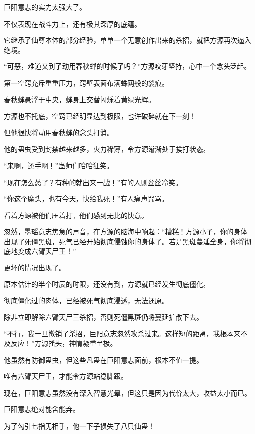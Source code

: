 
\begin{this_body}



巨阳意志的实力太强大了。

不仅表现在战斗力上，还有极其深厚的底蕴。

它继承了仙尊本体的部分经验，单单一个无意创作出来的杀招，就把方源再次逼入绝境。

“可恶，难道又到了动用春秋蝉的时候了吗？”方源咬牙坚持，心中一个念头泛起。

第一空窍充斥重重压力，窍壁表面布满蛛网般的裂痕。

春秋蝉悬浮于中央，蝉身上交替闪烁着黄绿光辉。

方源也不托底，空窍已经明显达到极限，也许破碎就在下一刻！

但他很快将动用春秋蝉的念头打消。

他的蛊虫受到封禁越来越多，火力稀薄，令方源渐渐处于挨打状态。

“来啊，还手啊！”蛊师们哈哈狂笑。

“现在怎么怂了？有种的就出来一战！”有的人则丝丝冷笑。

“你这个魔头，也有今天，快给我死！”有人痛声咒骂。

看着方源被他们压着打，他们感到无比的快意。

忽然，墨瑶意志焦急的声音，在方源的脑海中响起：“糟糕！方源小子，你的身体出现了死僵黑斑，死气已经开始彻底侵蚀你的身体了。若是黑斑蔓延全身，你将彻底地变成六臂天尸王！”

更坏的情况出现了。

原本估计的半个时辰的时限，还没有到，方源就已经发生彻底僵化。

彻底僵化过的肉体，已经被死气彻底浸透，无法还原。

除非立即解除六臂天尸王杀招，否则死僵黑斑仍将蔓延扩散下去。

“不行，我一旦撤销了杀招，巨阳意志忽然攻杀过来。这样短的距离，我根本来不及反应！”方源摇头，神情凝重至极。

他虽然有防御蛊虫，但这些凡蛊在巨阳意志面前，根本不值一提。

唯有六臂天尸王，才能令方源站稳脚跟。

现在，巨阳意志虽然没有深入智慧光晕，但这只是因为代价太大，收益太小而已。

巨阳意志绝对能舍能弃。

为了勾引七指无相手，他一下子损失了八只仙蛊！


\end{this_body}

